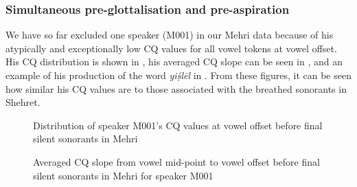 \documentclass[output=paper]{langscibook}
\begin{document}
\subsubsection{Simultaneous pre-glottalisation and pre-aspiration} %
\label{sec:watson:4.4.6}
We have so far excluded one speaker (M001) in our Mehri data because of his atypically and exceptionally low CQ values for all vowel tokens at vowel offset. His CQ distribution is shown in , his averaged CQ slope can be seen in , and an example of his production of the word \textit{yiṣ́lēl} in . From these figures, it can be seen how similar his CQ values are to those associated with the breathed sonorants in Shehret.\largerpage

\begin{figure}
\caption{Distribution of speaker M001’s CQ values at vowel offset before final silent sonorants in Mehri}
\label{fig:watson:27}
\end{figure}

\begin{figure}

\caption{Averaged CQ slope from vowel mid-point to vowel offset before final silent sonorants in Mehri for speaker M001}
\label{fig:watson:28}
\end{figure}
\end{document}
